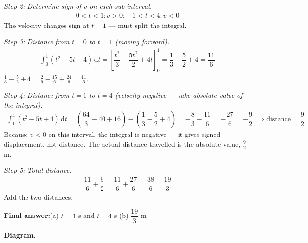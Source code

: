 \documentclass[11pt]{article}
\begin{document}
\textit{Step 2: Determine sign of \( v \) on each sub-interval.}
\[\begin{gathered}
0 < t < 1: v > 0;\quad 1 < t < 4: v < 0
\end{gathered}\]
The velocity changes sign at \( t = 1 \) --- must split the integral.

\textit{Step 3: Distance from \( t = 0 \) to \( t = 1 \) (moving forward).}
\[\begin{gathered}
\int_0^1 (t^2 - 5t + 4)\, \mathrm{d}t = \left[\dfrac{t^3}{3} - \dfrac{5t^2}{2} + 4t\right]_0^1 = \dfrac{1}{3} - \dfrac{5}{2} + 4 = \dfrac{11}{6}
\end{gathered}\]
\( \tfrac{1}{3} - \tfrac{5}{2} + 4 = \tfrac{2}{6} - \tfrac{15}{6} + \tfrac{24}{6} = \tfrac{11}{6} \).

\textit{Step 4: Distance from \( t = 1 \) to \( t = 4 \) (velocity negative --- take absolute value of the integral).}
\[\begin{gathered}
\int_1^4 (t^2 - 5t + 4)\, \mathrm{d}t = \left(\dfrac{64}{3} - 40 + 16\right) - \left(\dfrac{1}{3} - \dfrac{5}{2} + 4\right) = -\dfrac{8}{3} - \dfrac{11}{6} = -\dfrac{27}{6} = -\dfrac{9}{2} \implies \text{distance} = \dfrac{9}{2}
\end{gathered}\]
Because \( v < 0 \) on this interval, the integral is negative --- it gives signed displacement, not distance. The actual distance travelled is the absolute value, \( \tfrac{9}{2} \) m.

\textit{Step 5: Total distance.}
\[\begin{gathered}
\dfrac{11}{6} + \dfrac{9}{2} = \dfrac{11}{6} + \dfrac{27}{6} = \dfrac{38}{6} = \dfrac{19}{3}
\end{gathered}\]
Add the two distances.

\begin{answerbox}
\textbf{Final answer:}\quad (a) \(\displaystyle t = 1\) s and \(\displaystyle t = 4\) s   (b) \(\displaystyle \dfrac{19}{3}\) m
\end{answerbox}
\textbf{Diagram.}
\end{document}
